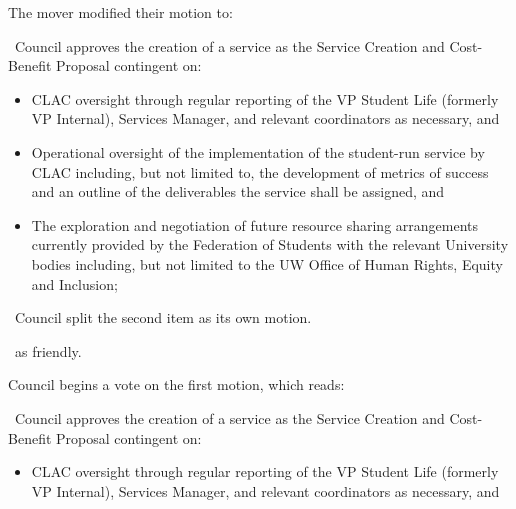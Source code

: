 \begin{motion}
\begin{motion}
        The mover modified their motion to:

        \begin{motion}
            \birt\ Council approves the creation of a service as the Service Creation
            and Cost-Benefit Proposal contingent on:

            \begin{itemize}
                \item CLAC oversight through regular reporting of the VP Student
                    Life (formerly VP Internal), Services Manager, and relevant
                    coordinators as necessary, and 

                \item Operational oversight of the implementation of the
                    student-run service by CLAC including, but not limited to, the
                    development of metrics of success and an outline of the
                    deliverables the service shall be assigned, and

                \item The exploration and negotiation of future resource sharing
                    arrangements currently provided by the Federation of Students with
                    the relevant University bodies including, but not limited to the UW
                    Office of Human Rights, Equity and Inclusion;

            \end{itemize}
        \end{motion}

        \begin{motion}
            \birt\ Council split the second item as its own motion.
            \movers{\seneca}{}

            \carries\ as friendly.
        \end{motion}

        Council begins a vote on the first motion, which reads:
        \begin{motion}
            \birt\ Council approves the creation of a service as the Service Creation
            and Cost-Benefit Proposal contingent on:

            \begin{itemize}
                \item CLAC oversight through regular reporting of the VP Student
                    Life (formerly VP Internal), Services Manager, and relevant
                    coordinators as necessary, and 


\end{itemize}
\end{motion}
\end{motion}
\end{motion}
